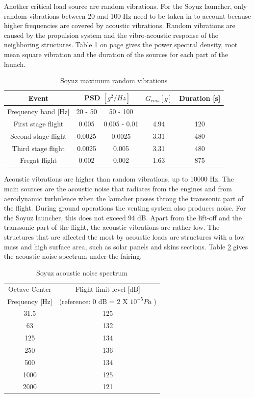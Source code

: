 Another critical load source are random vibrations. For the Soyuz launcher, only random vibrations between 20 and 100 Hz need to be taken in to account because higher frequencies are covered by acoustic vibrations. Random vibrations are caused by the propulsion system and the vibro-acoustic response of the neighboring structures. Table \ref{tab:random_vibr} on page \pageref{tab:random_vibr} gives the power spectral density, root mean square vibration and the duration of the sources for each part of the launch.

\begin{table}[H!]
\centering
\begin{tabular}{ccccc}
\toprule
 Event & \multicolumn{2}{c}{PSD $[g^2/Hz]$} & $G_{rms} [g]$ & Duration [s] \\
 \midrule
 Frequency band [Hz] & 20 - 50 & 50 - 100 & & \\
 \midrule
 First stage flight & 0.005 & 0.005 - 0.01 & 4.94 & 120 \\
 Second stage flight & 0.0025 & 0.0025 & 3.31 & 480 \\
 Third stage flight & 0.0025 & 0.005 & 3.31 & 480 \\
 Fregat flight & 0.002 & 0.002 & 1.63 & 875 \\
 \bottomrule
 \end{tabular}
 \caption{Soyuz maximum random vibrations}
\label{tab:random_vibr}
\end{table}

Acoustic vibrations are higher than random vibrations, up to 10000 Hz. The main sources are the acoustic noise that radiates from the engines and from aerodynamic turbulence when the launcher passes throug the transsonic part of the flight. During ground operations the venting system also produces noise. For the Soyuz launcher, this does not exceed 94 dB. Apart from the lift-off and the transsonic part of the flight, the acoustic vibrations are rather low. The structures that are affected the most by acoustic loads are structures with a low mass and high surface area, such as solar panels and skins sections. Table \ref{tab:acoustic_vibr} gives the acoustic noise spectrum under the fairing.

\begin{table}[H!]
\centering
\begin{tabular}{cc}
\toprule
Octave Center & Flight limit level [dB]\\
Frequency [Hz] & (reference: 0 dB = 2 X $10^{-5} Pa$ ) \\
\midrule
31.5 & 125\\
63 & 132 \\
125 & 134 \\
250 & 136 \\
500 & 134 \\
1000 & 125 \\
2000 & 121 \\
\bottomrule
 \end{tabular}
 \caption{Soyuz acoustic noise spectrum}
\label{tab:acoustic_vibr}
\end{table}

